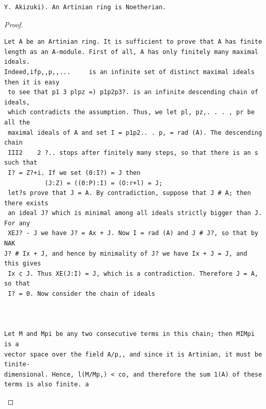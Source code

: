 \begin{theorem}\label{mcrt-auto-theorem-3-2}\uses{}
\begin{verbatim}
Y. Akizuki). An Artinian ring is Noetherian.
\end{verbatim}
\end{theorem}
\begin{proof}
\begin{verbatim}
Let A be an Artinian ring. It is sufficient to prove that A has finite
length as an A-module. First of all, A has only finitely many maximal ideals.
Indeed,ifp,,p,,...     is an infinite set of distinct maximal ideals then it is easy
 to see that p1 3 plpz =) p1p2p3?. is an infinite descending chain of ideals,
 which contradicts the assumption. Thus, we let pl, pz,. . . , pr be all the
 maximal ideals of A and set I = p1p2.. . p, = rad (A). The descending chain
 III2    2 ?.. stops after finitely many steps, so that there is an s such that
 I? = Z?+i. If we set (0:I?) = J then
           (J:Z) = ((0:P):I) = (O:r+l) = J;
 let?s prove that J = A. By contradiction, suppose that J # A; then there exists
 an ideal J? which is minimal among all ideals strictly bigger than J. For any
 XEJ? - J we have J? = Ax + J. Now I = rad (A) and J # J?, so that by NAK
J? # Ix + J, and hence by minimality of J? we have Ix + J = J, and this gives
 Ix c J. Thus XE(J:I) = J, which is a contradiction. Therefore J = A, so that
 I? = 0. Now consider the chain of ideals



Let M and Mpi be any two consecutive terms in this chain; then MIMpi is a
vector space over the field A/p,, and since it is Artinian, it must be tinite-
dimensional. Hence, l(M/Mp,) < co, and therefore the sum 1(A) of these
terms is also finite. a
\end{verbatim}
\end{proof}


